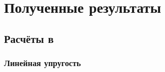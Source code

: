 \newpage
\section{Полученные результаты}
\subsection{Расчёты в }
\subsubsection{Линейная упругость}
